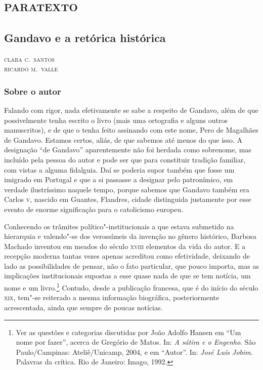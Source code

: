 \part{\textsc{paratexto}}

\chapter{Gandavo e a retórica histórica}

\begin{flushright}
\textsc{clara c.~santos\\ricardo m.~valle}
\end{flushright}

\section{Sobre o autor}

\noindent{}Falando com rigor, nada efetivamente se sabe a respeito de Gandavo,
além de que possivelmente tenha escrito o livro (mais uma ortografia e
alguns outros manuscritos), e de que o tenha feito assinando com este
nome, Pero de Magalhães de Gandavo. Estamos certos, aliás, de que
sabemos até menos do que isso. A designação ``de Gandavo'' 
aparentemente não foi herdada como sobrenome, mas incluído pela pessoa 
do autor e pode ser que para constituir tradição familiar, com vistas a alguma 
fidalguia. Daí se poderia supor também que fosse um imigrado em Portugal 
e que a si passasse a designar pelo patronímico, em verdade ilustríssimo naquele tempo, 
porque sabemos que Gandavo também era Carlos \textsc{v}, nascido em Guantes, 
Flandres, cidade distinguida justamente por esse evento de enorme 
significação para o catolicismo europeu.

Conhecendo os trâmites político"-institucionais a que estava submetido na
hierarquia e valendo"-se dos verossímeis da invenção no gênero
histórico, Barbosa Machado inventou em meados do século 	\textsc{xviii} elementos
da vida do autor. E a recepção moderna tantas vezes apenas acreditou
como efetividade, deixando de lado as possibilidades de pensar, não o
fato particular, que pouco importa, mas as implicações institucionais
supostas a esse quase nada de que se tem notícia, um nome e um
livro.\footnote{ Ver as questões e categorias discutidas por João Adolfo
Hansen em ``Um nome por fazer'', acerca de Gregório de Matos. In: \textit{A sátira e o Engenho}. 
São Paulo/Campinas: Ateliê/Unicamp, 2004, e em “Autor”. In: \textit{José Luís Jobim}. Palavras da
crítica. Rio de Janeiro: Imago, 1992.} Contudo, desde a publicação
francesa, que é do início do século \textsc{xix}, tem"-se reiterado a mesma
informação biográfica, posteriormente acrescentada, ainda que sempre de
poucas notícias.

